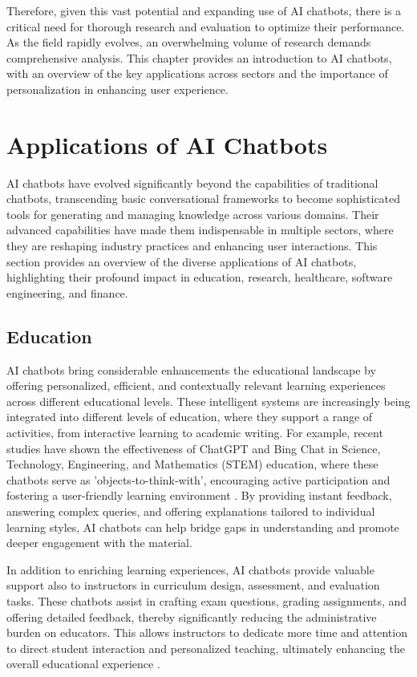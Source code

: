 Therefore, given this vast potential and expanding use of AI chatbots, there is a critical need for thorough research and evaluation to optimize their performance. As the field rapidly evolves, an overwhelming volume of research demands comprehensive analysis. This chapter provides an introduction to AI chatbots, with an overview of the key applications across sectors and the importance of personalization in enhancing user experience.

\section{Applications of AI Chatbots}

AI chatbots have evolved significantly beyond the capabilities of traditional chatbots, transcending basic conversational frameworks to become sophisticated tools for generating and managing knowledge across various domains. Their advanced capabilities have made them indispensable in multiple sectors, where they are reshaping industry practices and enhancing user interactions. This section provides an overview of the diverse applications of AI chatbots, highlighting their profound impact in education, research, healthcare, software engineering, and finance.

\subsection{Education}

AI chatbots bring considerable enhancements the educational landscape by offering personalized, efficient, and contextually relevant learning experiences across different educational levels. These intelligent systems are increasingly being integrated into different levels of education, where they support a range of activities, from interactive learning to academic writing. For example, recent studies have shown the effectiveness of ChatGPT and Bing Chat in Science, Technology, Engineering, and Mathematics (STEM) education, where these chatbots serve as 'objects-to-think-with', encouraging active participation and fostering a user-friendly learning environment \cite{vasconcelos2023enhancing}. By providing instant feedback, answering complex queries, and offering explanations tailored to individual learning styles, AI chatbots can help bridge gaps in understanding and promote deeper engagement with the material.

In addition to enriching learning experiences, AI chatbots provide valuable support also to instructors in curriculum design, assessment, and evaluation tasks. These chatbots assist in crafting exam questions, grading assignments, and offering detailed feedback, thereby significantly reducing the administrative burden on educators. This allows instructors to dedicate more time and attention to direct student interaction and personalized teaching, ultimately enhancing the overall educational experience \cite{lo2023impact}.

